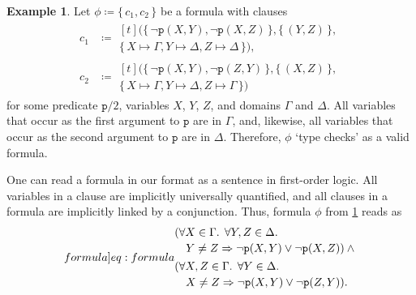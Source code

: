 \documentclass{article}
\theoremstyle{definition}
\newtheorem{example}{Example}
\theoremstyle{remark}
\begin{document}
\begin{example}\label{example:first}
  Let $\phi \coloneqq \{\, c_1, c_2 \,\}$ be a formula with clauses
  \begin{align*}
    c_1 &\coloneqq
          \begin{multlined}[t]
            (\{\, \neg \texttt{p}(X, Y), \neg \texttt{p}(X, Z) \,\}, \{\, (Y, Z) \,\}, \\
            \{\, X \mapsto \Gamma, Y \mapsto \Delta, Z \mapsto \Delta \,\}),
          \end{multlined}\\
    c_2 &\coloneqq
          \begin{multlined}[t]
            (\{\, \neg \texttt{p}(X, Y), \neg \texttt{p}(Z, Y) \,\}, \{\, (X, Z) \,\}, \\
            \{\, X \mapsto \Gamma, Y \mapsto \Delta, Z \mapsto \Gamma \,\})
          \end{multlined}
  \end{align*}
  for some predicate $\texttt{p}/2$, variables $X$, $Y$, $Z$, and domains
  $\Gamma$ and $\Delta$. All variables that occur as the first argument to
  $\texttt{p}$ are in $\Gamma$, and, likewise, all variables that occur as the
  second argument to $\texttt{p}$ are in $\Delta$. Therefore, $\phi$ `type
  checks' as a valid formula.
\end{example}

One can read a formula in our format as a sentence in first-order logic. All
variables in a clause are implicitly universally quantified, and all clauses in
a formula are implicitly linked by a conjunction. Thus, formula $\phi$ from
\cref{example:first} reads as
\begin{equation}\label[formula]{eq:formula}
  \begin{split}
    &\begin{multlined}[t]
      (\forall X \in \Gamma\text{. }\forall Y, Z \in \Delta\text{. }\\
      Y \ne Z \Rightarrow \neg \texttt{p}(X, Y) \lor \neg \texttt{p}(X, Z)) \land{}
    \end{multlined}\\
    &\begin{multlined}[t]
      (\forall X, Z \in \Gamma\text{. }\forall Y \in \Delta\text{. }\\
      X \ne Z \Rightarrow \neg \texttt{p}(X, Y) \lor \neg \texttt{p}(Z, Y)).
    \end{multlined}
  \end{split}
\end{equation}
\end{document}
